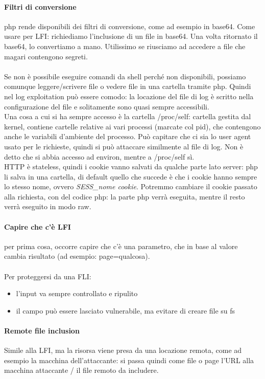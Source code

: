 \documentclass{article}
\begin{document}
\paragraph{Filtri di conversione}php rende disponibili dei filtri di conversione, come ad esempio in base64. Come usare per LFI: richiediamo l'inclusione di un file in base64. Una volta ritornato il base64, lo convertiamo a mano. Utilissimo se riusciamo ad accedere a file che magari contengono segreti.\\\\ Se non è possibile eseguire comandi da shell perché non disponibili, possiamo comunque leggere/scrivere file o vedere file in una cartella tramite php. Quindi nel log exploitation può essere comodo: la locazione del file di log è scritto nella configurazione del file e solitamente sono quasi sempre accessibili. \\ Una cosa a cui si ha sempre accesso è la cartella \textsf{/proc/self}: cartella gestita dal kernel, contiene cartelle relative ai vari processi (marcate col pid), che contengono anche le variabili d'ambiente del processo. Può capitare che ci sia lo user agent usato per le richieste, quindi si può attaccare similmente al file di log. Non è detto che si abbia accesso ad environ, mentre a /proc/self sì.\\ HTTP è stateless, quindi i cookie vanno salvati da qualche parte lato server: php li salva in una cartella, di default quello che succede è che i cookie hanno sempre lo stesso nome, ovvero \textit{SESS\_nome cookie}. Potremmo cambiare il cookie passato alla richiesta, con del codice php: la parte php verrà eseguita, mentre il resto verrà eseguito in modo raw.
\paragraph{Capire che c'è LFI}per prima cosa, occorre capire che c'è una parametro, che in base al valore cambia risultato (ad esempio: page=qualcosa).\\\\ Per proteggersi da una FLI:
\begin{itemize}
\item l'input va sempre controllato e ripulito
\item il campo può essere lasciato vulnerabile, ma evitare di creare file su fs
\end{itemize}
\paragraph{Remote file inclusion}
Simile alla LFI, ma la risorsa viene presa da una locazione remota, come ad esempio la macchina dell'attaccante: si passa quindi come file o page l'URL alla macchina attaccante / il file remoto da includere.
\end{document}
